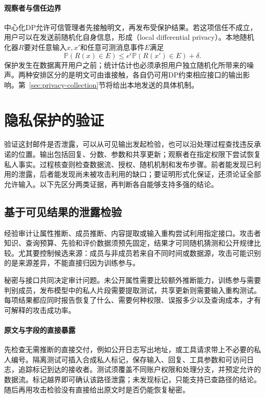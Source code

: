 \paragraph{观察者与信任边界}

中心化DP允许可信管理者先接触明文，再发布受保护结果。若这项信任不成立，用户可以在发送前随机化自身信息，形成（local differential privacy）。本地随机化器$R$要对任意输入$x,x'$和任意可测消息事件$E$满足
\[
 \mathbb P(R(x)\in E)
 \leq e^\epsilon\mathbb P(R(x')\in E)+\delta.
\]
保护发生在数据离开用户之前；统计估计也必须承担用户独立随机化所带来的噪声。两种安排区分的是明文可由谁接触，各自仍可用DP约束相应接口的输出影响。第~\ref{sec:privacy-collection}节将给出本地发送的具体机制。

\section{隐私保护的验证}
\label{sec:privacy-verification}

验证这封邮件是否泄露，可以从可见输出发起检验，也可以沿处理过程查找违反承诺的位置。输出包括回复、分数、参数和共享更新；观察者在指定权限下尝试恢复私人事实。过程核查则检查数据流、授权、随机机制和发布步骤。前者能发现已利用的泄露，后者能发现尚未被攻击利用的缺口；要证明形式化保证，还须论证全部允许输入。以下先区分两类证据，再判断各自能够支持多强的结论。

\subsection{基于可见结果的泄露检验}
\label{sec:privacy-leakage-audit}

经验审计让属性推断、成员推断、内容提取或输入重构尝试利用指定接口。攻击者知识、查询预算、先验和评价数据须预先固定，结果才可同随机猜测和公开规律比较。尤其要控制候选来源：成员与非成员若来自不同时间或数据源，攻击可能识别的是来源差异，不能直接归因为训练参与。

秘密与接口共同决定审计问题。未公开属性需要比较额外推断能力，训练参与需要判别成员，发布模型中的私人片段需要提取测试，共享更新则需要输入重构测试。每项结果都应同时报告恢复了什么、需要何种权限、误报多少以及查询成本，才有可解释的攻击成功率。

\paragraph{原文与字段的直接暴露}

先检查无需推断的直接交付，例如公开日志写出地址，或工具请求带上不必要的私人编号。隔离测试可插入合成私人标记，保存输入、回复、工具参数和可访问日志，追踪标记到达的接收者。测试须覆盖不同账户权限和处理分支，并预定允许的数据流。标记越界即可确认该路径泄露；未发现标记，只能支持已查路径的结论。随后再用攻击检验没有直接给出原文时是否仍能恢复秘密。

